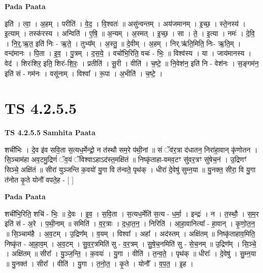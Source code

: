 \documentclass[17pt]{extarticle}
\begin{document}
\textbf{Pada Paata} \newline

इति॑ । त्वा॒ । अ॒हम् । परीति॑ । वे॒द॒ । वि॒श्वतः॑ ॥ असु॑न्वन्तम् । अय॑जमानम् । इ॒च्छ॒ । स्ते॒नस्य॑ । इ॒त्याम् । तस्क॑रस्य । अन्विति॑ । ए॒षि॒ ॥ अ॒न्यम् । अ॒स्मत् । इ॒च्छ॒ । सा । ते॒ । इ॒त्या । नमः॑ । दे॒वि॒ । नि॒र्॒.ऋ॒त॒ इति॑ निः - ऋ॒ते॒ । तुभ्य᳚म् । अ॒स्तु॒ ॥ दे॒वीम् । अ॒हम् । निर्.ऋ॑ति॒मिति॒ निः- ऋ॒ति॒म् । वन्द॑मानः । पि॒ता । इ॒व॒ । पु॒त्रम् । द॒स॒ये॒ । वचो॑भि॒रिति॒ वचः॑ - भिः॒ ॥ विश्व॑स्य । या । जाय॑मानस्य । वेद॑ । शिरः॑शिर॒ इति॒ शिरः॑-शि॒रः॒ । प्रतीति॑ । सू॒री । वीति॑ । च॒ष्टे॒ ॥ नि॒वेश॑न॒ इति॑ नि - वेश॑नः । स॒ङ्गम॑न॒ इति॑ सं - गम॑नः । वसू॑नाम् । विश्वा᳚ । रू॒पा । अ॒भीति॑ । च॒ष्टे॒ ।  \newline





\section{ TS 4.2.5.5 }

\textbf{TS 4.2.5.5 } \newline
\textbf{Samhita Paata} \newline

शची॑भिः । दे॒व इ॑व सवि॒ता स॒त्यध॒र्मेन्द्रो॒ न त॑स्थौ सम॒रे प॑थी॒नां ॥ सं ॅव॑र॒त्रा द॑धातन॒ निरा॑हा॒वान् कृ॑णोतन । सि॒ञ्चाम॑हा अव॒टमु॒द्रिणं॑ ॅव॒यं ॅविश्वाऽहाऽद॑स्त॒मक्षि॑तं ॥ निष्कृ॑ताहा-वमव॒टꣳ सु॑वर॒त्रꣳ सु॑षेच॒नं । उ॒द्रिणꣳ॑ सिञ्चे॒ अक्षि॑तं ॥ सीरा॑ युञ्जन्ति क॒वयो॑ यु॒गा वि त॑न्वते॒ पृथ॑क् । धीरा॑ दे॒वेषु॑ सुम्न॒या ॥ यु॒नक्त॒ सीरा॒ वि यु॒गा त॑नोत कृ॒ते योनौ॑ वपते॒ह - [  ] \newline

\textbf{Pada Paata} \newline

शची॑भि॒रिति॒ शचि॑ - भिः॒ ॥ दे॒वः । इ॒व॒ । स॒वि॒ता । स॒त्यध॒र्मेति॑ स॒त्य - ध॒र्मा॒ । इन्द्रः॑ । न । त॒स्थौ॒ । स॒म॒र इति॑ सं - अ॒रे । प॒थी॒नाम् ॥ समिति॑ । व॒र॒त्राः । द॒धा॒त॒न॒ । निरिति॑ । आ॒हा॒वानित्या᳚ - हा॒वान् । कृ॒णो॒त॒न॒ ॥ सि॒ञ्चाम॑है । अ॒व॒टम् । उ॒द्रिण᳚म् । व॒यम् । विश्वा᳚ । अहा᳚ । अद॑स्तम् । अक्षि॑तम् ॥ निष्कृ॑ताहाव॒मिति॒ निष्कृ॑त - आ॒हा॒व॒म् । अ॒व॒टम् । सु॒व॒र॒त्रमिति॑ सु - व॒र॒त्रम् । सु॒षे॒च॒नमिति॑ सु - से॒च॒नम् ॥ उ॒द्रिण᳚म् । सि॒ञ्चे॒ । अक्षि॑तम् ॥ सीरा᳚ । यु॒ञ्ज॒न्ति॒ । क॒वयः॑ । यु॒गा । वीति॑ । त॒न्व॒ते॒ । पृथ॑क् ॥ धीराः᳚ । दे॒वेषु॑ । सु॒म्न॒या ॥ यु॒नक्त॑ । सीरा᳚ । वीति॑ । यु॒गा । त॒नो॒त॒ । कृ॒ते । योनौ᳚ । व॒प॒त॒ । इ॒ह ।  \newline
\end{document}
